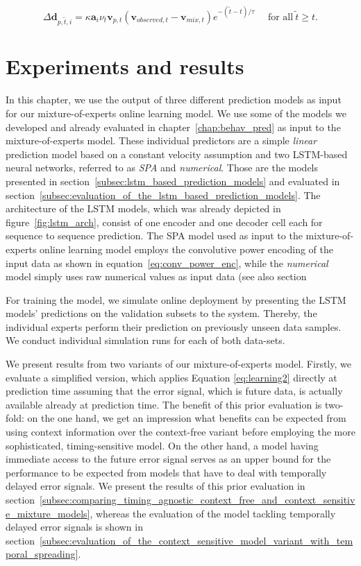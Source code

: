 \begin{equation}
    \Delta\mathbf{d}_{p, \tilde{t} ,i} = \kappa \mathbf{a}_i \nu_{t} \mathbf{v}_{p,t} (\mathbf{v}_{observed,t}-\mathbf{v}_{mix,t}) e^{-{( \tilde{t} - t)}/\tau} ~~~~~~ \textrm{for all}~ \tilde{t}  \geq t.
  \label{eq:learning3}
\end{equation}

\section{Experiments and results}%
\label{sec:experiments_and_results}

In this chapter, we use the output of three different prediction models as input for our mixture-of-experts online learning model.
We use some of the models we developed and already evaluated in chapter~\ref{chap:behav_pred} as input to the mixture-of-experts model.
These individual predictors are a simple \emph{linear} prediction model based on a constant velocity assumption and two \ac{LSTM}-based neural networks, referred to as \emph{\acs{SPA}} and \emph{numerical}.
Those are the models presented in section~\ref{subsec:lstm_based_prediction_models} and evaluated in section~\ref{subsec:evaluation_of_the_lstm_based_prediction_models}.
The architecture of the \ac{LSTM} models, which was already depicted in figure~\ref{fig:lstm_arch}, consist of one encoder and one decoder cell each for sequence to sequence prediction.
The \ac{SPA} model used as input to the mixture-of-experts online learning model employs the convolutive power encoding of the input data as shown in equation~\eqref{eq:conv_power_enc}, while the \emph{numerical} model simply uses raw numerical values as input data (see also section

For training the model, we simulate online deployment by presenting the \ac{LSTM} models' predictions on the validation subsets to the system.
Thereby, the individual experts perform their prediction on previously unseen data samples.
We conduct individual simulation runs for each of both data-sets.

We present results from two variants of our mixture-of-experts model.
Firstly, we evaluate a simplified version, which applies Equation \eqref{eq:learning2} directly at prediction time assuming that the error signal, which is future data, is actually available already at prediction time. 
The benefit of this prior evaluation is two-fold: on the one hand, we get an impression what benefits can be expected from using context information over the context-free variant before employing the more sophisticated, timing-sensitive model.
On the other hand, a model having immediate access to the future error signal serves as an upper bound for the performance to be expected from models that have to deal with temporally delayed error signals. 
We present the results of this prior evaluation in section~\ref{subsec:comparing_timing_agnostic_context_free_and_context_sensitive_mixture_models}, whereas the evaluation of the model tackling temporally delayed error signals is shown in section~\ref{subsec:evaluation_of_the_context_sensitive_model_variant_with_temporal_spreading}.

